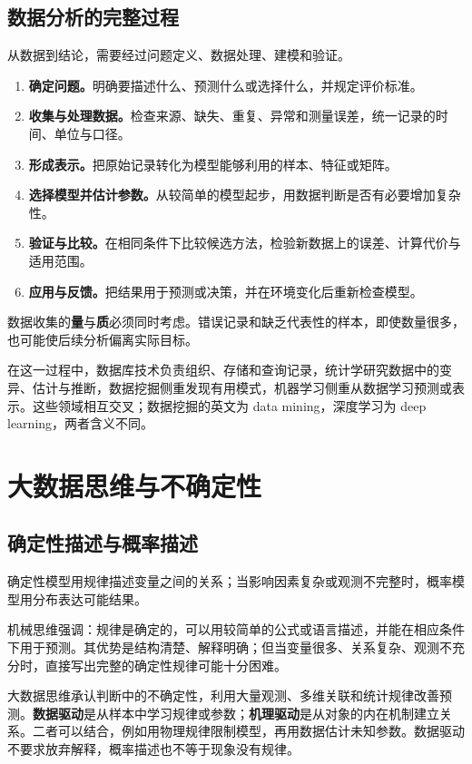 \documentclass[UTF8,fontset=fandol,a4paper,12pt]{ctexart}
\theoremstyle{definition}
\begin{document}
\subsection{数据分析的完整过程}
从数据到结论，需要经过问题定义、数据处理、建模和验证。
\begin{enumerate}
\item \textbf{确定问题。}明确要描述什么、预测什么或选择什么，并规定评价标准。
\item \textbf{收集与处理数据。}检查来源、缺失、重复、异常和测量误差，统一记录的时间、单位与口径。
\item \textbf{形成表示。}把原始记录转化为模型能够利用的样本、特征或矩阵。
\item \textbf{选择模型并估计参数。}从较简单的模型起步，用数据判断是否有必要增加复杂性。
\item \textbf{验证与比较。}在相同条件下比较候选方法，检验新数据上的误差、计算代价与适用范围。
\item \textbf{应用与反馈。}把结果用于预测或决策，并在环境变化后重新检查模型。
\end{enumerate}
数据收集的\textbf{量}与\textbf{质}必须同时考虑。错误记录和缺乏代表性的样本，即使数量很多，也可能使后续分析偏离实际目标。

在这一过程中，数据库技术负责组织、存储和查询记录，统计学研究数据中的变异、估计与推断，数据挖掘侧重发现有用模式，机器学习侧重从数据学习预测或表示。这些领域相互交叉；数据挖掘的英文为 data mining，深度学习为 deep learning，两者含义不同。

\section{大数据思维与不确定性}\label{sec:thinking}
\subsection{确定性描述与概率描述}
确定性模型用规律描述变量之间的关系；当影响因素复杂或观测不完整时，概率模型用分布表达可能结果。

机械思维强调：规律是确定的，可以用较简单的公式或语言描述，并能在相应条件下用于预测。其优势是结构清楚、解释明确；但当变量很多、关系复杂、观测不充分时，直接写出完整的确定性规律可能十分困难。

大数据思维承认判断中的不确定性，利用大量观测、多维关联和统计规律改善预测。\textbf{数据驱动}是从样本中学习规律或参数；\textbf{机理驱动}是从对象的内在机制建立关系。二者可以结合，例如用物理规律限制模型，再用数据估计未知参数。数据驱动不要求放弃解释，概率描述也不等于现象没有规律。
\end{document}

